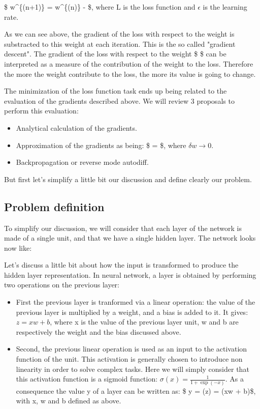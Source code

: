 \documentclass[11pt]{article}
\providecommand{\tightlist}{%
      \setlength{\itemsep}{0pt}\setlength{\parskip}{0pt}}
\begin{document}
\$ w\^{}\{(n+1)\} = w\^{}\{(n)\} -
\epsilon {} \$, where L is the loss function
and \(\epsilon\) is the learning rate.

As we can see above, the gradient of the loss with respect to the weight
is substracted to this weight at each iteration. This is the so called
"gradient descent". The gradient of the loss with respect to the weight
\$\epsilon {} \$ can be interpreted as a
measure of the contribution of the weight to the loss. Therefore the
more the weight contribute to the loss, the more its value is going to
change.

The minimization of the loss function task ends up being related to the
evaluation of the gradients described above. We will review 3 proposals
to perform this evaluation:

\begin{itemize}
\tightlist
\item
  Analytical calculation of the gradients.
\item
  Approximation of the gradients as being: \$
   =
  \$, where
  \(\delta w \rightarrow 0\).
\item
  Backpropagation or reverse mode autodiff.
\end{itemize}

But first let's simplify a little bit our discussion and define clearly
our problem.

\subsection{Problem definition}\label{problem-definition}

To simplify our discussion, we will consider that each layer of the
network is made of a single unit, and that we have a single hidden
layer. The network looks now like:

Let's discuss a little bit about how the input is transformed to produce
the hidden layer representation. In neural network, a layer is obtained
by performing two operations on the previous layer:

\begin{itemize}
\tightlist
\item
  First the previous layer is tranformed via a linear operation: the
  value of the previous layer is multiplied by a weight, and a bias is
  added to it. It gives: \(z = xw + b\), where x is the value of the
  previous layer unit, w and b are respectively the weight and the bias
  discussed above.
\item
  Second, the previous linear operation is used as an input to the
  activation function of the unit. This activation is generally chosen
  to introduce non linearity in order to solve complex tasks. Here we
  will simply consider that this activation function is a sigmoid
  function: \(\sigma(x) = \frac{1}{1+\exp(-x)}\). As a consequence the
  value y of a layer can be written as: \$ y = \sigma (z) = \sigma (xw +
  b)\$, with x, w and b defined as above.
\end{itemize}
\end{document}
